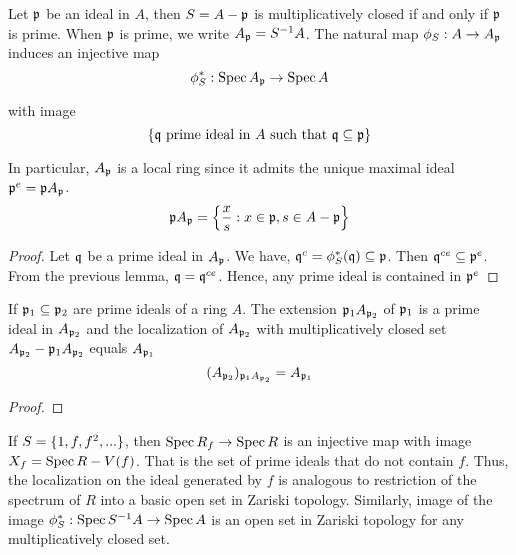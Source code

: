 \begin{remark}
	Let $\mf{p}$ be an ideal in $A$, then $S = A - \mf{p}$ is multiplicatively closed if and only if $\mf{p}$ is prime. When $\mf{p}$ is prime, we write $A_\mf{p} = S^{-1} A$. The natural map $\phi_S: A \to A_\mf{p}$ induces an injective map
	$$
		\phi_S^*: \Spec A_\mf{p} \to \Spec A
	$$
	
	with image 
	$$
		\set{\mf{q} \text{ prime ideal in } A \text{ such that } \mf{q} \subseteq \mf{p}}
	$$

	In particular, $A_\mf{p}$ is a local ring since it admits the unique maximal ideal $\mf{p}^e = \mf{p} A_\mf{p}$.
	$$
		\mf{p} A_\mf{p} = \set*{\frac{x}{s}: x \in \mf{p}, s \in A - \mf{p}}
	$$
	
\end{remark}

\begin{proof}
	Let $\mf{q}$ be a prime ideal in $A_\mf{p}$. We have, $\mf{q}^c = \phi_S^*(\mf{q}) \subseteq \mf{p}$. Then $\mf{q}^{ce} \subseteq \mf{p}^e$. From the previous lemma, $\mf{q} = \mf{q}^{ce}$. Hence, any prime ideal is contained in $\mf{p}^e$
\end{proof}

\begin{remark}
	If $\mf{p}_1 \subseteq \mf{p}_2$ are prime ideals of a ring $A$. The extension $\mf{p}_1 A_{\mf{p}_2}$ of $\mf{p}_1$ is a prime ideal in $A_{\mf{p}_2}$ and the localization of $A_{\mf{p}_2}$ with multiplicatively closed set $A_{\mf{p}_2} - \mf{p}_1 A_{\mf{p}_2}$ equals $A_{\mf{p}_1}$
	$$
		(A_{\mf{p}_2})_{\mf{p}_1 A_{\mf{p}_2}} = A_{\mf{p}_1}
	$$
\end{remark}

\begin{proof}
\end{proof}
	
\begin{remark}
	If $S = \set{1, f, f^2, ...}$, then $\Spec R_f \to \Spec R$ is an injective map with image $X_f = \Spec R - V(f)$. That is the set of prime ideals that do not contain $f$. Thus, the localization on the ideal generated by $f$ is analogous to restriction of the spectrum of $R$ into a basic open set in Zariski topology. Similarly, image of the image $\phi_S^*: \Spec S^{-1} A \to \Spec A$ is an open set in Zariski topology for any multiplicatively closed set.
\end{remark}

